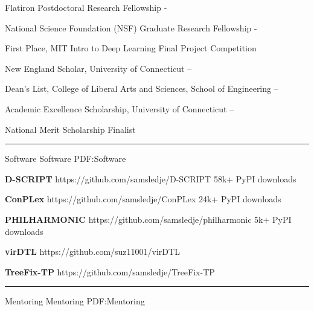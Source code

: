 \documentclass[letterpaper,MMMyyyy,nonstopmode]{simpleresumecv}
\begin{document}
\begin{Body}
\Entry
{Flatiron Postdoctoral Research Fellowship}
\hfill
{} - 
\Gap

\Entry
{National Science Foundation (NSF) Graduate Research Fellowship}
\hfill
{} - 
\Gap

\Entry
{First Place, MIT Intro to Deep Learning Final Project Competition}
\hfill
{}
\Gap

\Entry
{New England Scholar, University of Connecticut}
\hfill
{} -- 
\Gap

\Entry
{Dean's List, College of Liberal Arts and Sciences, School of Engineering}
\hfill
{} --
\Gap

\Entry
{Academic Excellence Scholarship, University of Connecticut}
\hfill
{} -- 
\Gap




\Entry
{National Merit Scholarship Finalist}
\hfill
{}

\BigGap
\hrule
\Section
{Software}
{Software}
{PDF:Software}

\Entry
{\textbf{D-SCRIPT}}
\hfill https://github.com/samsledje/D-SCRIPT
\Gap
\Item
58k+ PyPI downloads
\BigGap

\Entry
{\textbf{ConPLex}}
\hfill https://github.com/samsledje/ConPLex
\Gap
\Item
24k+ PyPI downloads
\BigGap

\Entry
{\textbf{PHILHARMONIC}}
\hfill https://github.com/samsledje/philharmonic
\Gap
\Item
5k+ PyPI downloads
\BigGap

\Entry
{\textbf{virDTL}}
\hfill https://github.com/suz11001/virDTL
\BigGap

\Entry
{\textbf{TreeFix-TP}}
\hfill https://github.com/samsledje/TreeFix-TP
\BigGap



\BigGap
\hrule
\Section
{Mentoring}
{Mentoring}
{PDF:Mentoring}


\end{Body}
\end{document}
